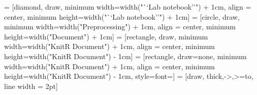 \documentclass[landscape]{article}
\begin{document}
\pagestyle{empty}




 = [diamond, draw,
    minimum width={width("``Lab notebook''") + 1cm},
    align = center, 
    minimum height={width("``Lab notebook''") + 1cm}]
 = [circle, draw, 
    minimum width={width("Preprocessing") + 1cm},
    align = center, 
    minimum height={width("Document") + 1cm}]
 = [rectangle, draw,
    minimum width={width("KnitR Document") + 1cm},
    align = center, 
    minimum height={width("KnitR Document") - 1cm}]
 = [rectangle, draw=none,
    minimum width={width("KnitR Document") + 1cm},
    align = center, 
    minimum height={width("KnitR Document") - 1cm},
    style={font=\Huge{}\selectfont}]
 = [draw, thick,->,>=to, line width = 2pt]

\end{document}
